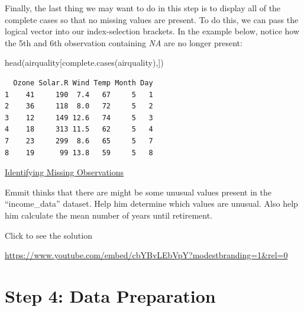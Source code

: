 \documentclass[
  letterpaper,
  DIV=11,
  numbers=noendperiod]{scrreprt}
\newenvironment{Shaded}{\begin{snugshade}}{\end{snugshade}}
\newcommand{\FunctionTok}[1]{\textcolor[rgb]{0.28,0.35,0.67}{#1}}
\newcommand{\NormalTok}[1]{\textcolor[rgb]{0.00,0.23,0.31}{#1}}
\begin{document}
Finally, the last thing we may want to do in this step is to display all
of the complete cases so that no missing values are present. To do this,
we can pass the logical vector into our index-selection brackets. In the
example below, notice how the 5th and 6th observation containing
\emph{NA} are no longer present:

\begin{Shaded}
\begin{Highlighting}[]
\FunctionTok{head}\NormalTok{(airquality[}\FunctionTok{complete.cases}\NormalTok{(airquality),])}
\end{Highlighting}
\end{Shaded}

\begin{verbatim}
  Ozone Solar.R Wind Temp Month Day
1    41     190  7.4   67     5   1
2    36     118  8.0   72     5   2
3    12     149 12.6   74     5   3
4    18     313 11.5   62     5   4
7    23     299  8.6   65     5   7
8    19      99 13.8   59     5   8
\end{verbatim}

\begin{watch}{}{}
    \href{https://youtu.be/Qqs3RrHd4xQ}{Identifying Missing Observations}
\end{watch}

\begin{tcolorbox}[enhanced jigsaw, leftrule=.75mm, arc=.35mm, coltitle=black, rightrule=.15mm, bottomrule=.15mm, toprule=.15mm, left=2mm, colbacktitle=quarto-callout-tip-color!10!white, title=\textcolor{quarto-callout-tip-color}{\faLightbulb}\hspace{0.5em}{Try it Out}, toptitle=1mm, breakable, colframe=quarto-callout-tip-color-frame, bottomtitle=1mm, titlerule=0mm, colback=white, opacityback=0, opacitybacktitle=0.6]

Emmit thinks that there are might be some unusual values present in the
``income\_data'' dataset. Help him determine which values are unusual.
Also help him calculate the mean number of years until retirement.

Click to see the solution

\url{https://www.youtube.com/embed/cbYBvLEbVpY?modestbranding=1&rel=0}

\end{tcolorbox}

\section{Step 4: Data Preparation}\label{step-4-data-preparation}
\end{document}
